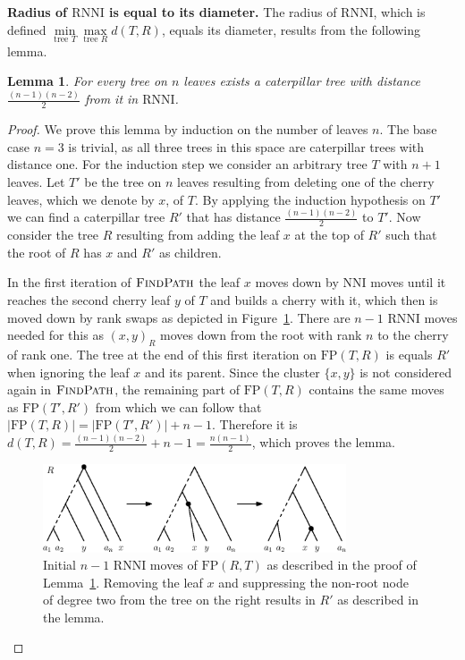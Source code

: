 \documentclass[11pt]{amsart}
\newtheorem{lemma}{Lemma}
\newcommand{\rnni}{\mathrm{RNNI}}
\newcommand{\findpath}{\textsc{FindPath}}
\newcommand{\nni}{\mathrm{NNI}}
\newcommand{\fp}{\mathrm{FP}}
\newcommand{\summary}[1]{\textbf{#1}} %
\begin{document}
\summary{Radius of $\rnni$ is equal to its diameter.}
The radius of $\rnni$, which is defined $\min\limits_{\text{tree } T}\max\limits_{\text{tree }R} d(T,R)$, equals its diameter, results from the following lemma.

\begin{lemma}
	For every tree on $n$ leaves exists a caterpillar tree with distance $\frac{(n-1)(n-2)}{2}$ from it in $\rnni$.
	\label{lemma:max_dist_ctree}
\end{lemma}

\begin{proof}
	We prove this lemma by induction on the number of leaves $n$.
	The base case $n=3$ is trivial, as all three trees in this space are caterpillar trees with distance one.
	For the induction step we consider an arbitrary tree $T$ with $n + 1$ leaves.
	Let $T'$ be the tree on $n$ leaves resulting from deleting one of the cherry leaves, which we denote by $x$, of $T$.
	By applying the induction hypothesis on $T'$ we can find a caterpillar tree $R'$ that has distance $\frac{(n-1)(n-2)}{2}$ to $T'$.
	Now consider the tree $R$ resulting from adding the leaf $x$ at the top of $R'$ such that the root of $R$ has $x$ and $R'$ as children.

	In the first iteration of $\findpath$ the leaf $x$ moves down by $\nni$ moves until it reaches the second cherry leaf $y$ of $T$ and builds a cherry with it, which then is moved down by rank swaps as depicted in Figure~\ref{fig:max_dist_ctree}.
	There are $n-1$ $\rnni$ moves needed for this as $(x,y)_R$ moves down from the root with rank $n$ to the cherry of rank one.
	The tree at the end of this first iteration on $\fp(T,R)$ is equals $R'$ when ignoring the leaf $x$ and its parent.
	Since the cluster $\{x,y\}$ is not considered again in $\findpath$, the remaining part of $\fp(T,R)$ contains the same moves as $\fp(T',R')$ from which we can follow that $|\fp(T,R)| = |\fp(T',R')| + n-1$.
	Therefore it is $d(T,R) = \frac{(n-1)(n-2)}{2} + n-1 = \frac{n(n-1)}{2}$, which proves the lemma.
	\begin{figure}[ht]
		\includegraphics[width=0.8\textwidth]{max_dist_ctree.eps}
		\caption{Initial $n - 1$ $\rnni$ moves of $\fp(R,T)$ as described in the proof of Lemma~\ref{lemma:max_dist_ctree}.
		Removing the leaf $x$ and suppressing the non-root node of degree two from the tree on the right results in $R'$ as described in the lemma.}
		\label{fig:max_dist_ctree}
	\end{figure}
\end{proof}
\end{document}
